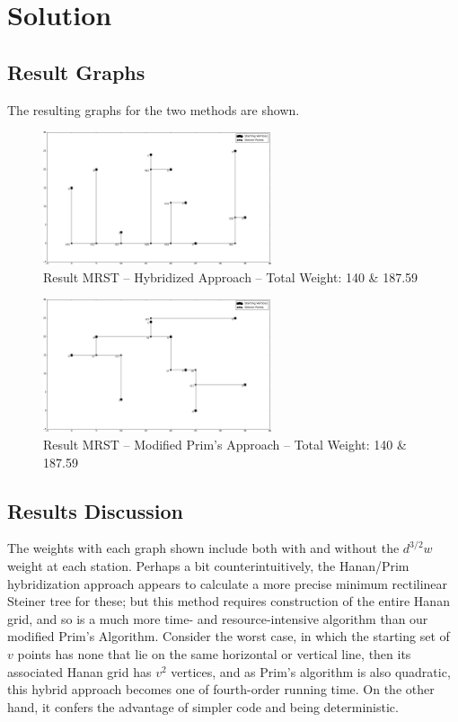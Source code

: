 \documentclass[12pt,letterpaper]{article}
\theoremstyle{definition}\newtheorem{defn}[defncounter]{Definition}
\theoremstyle{remark}\newtheorem*{remark}{Remark}
\begin{document}
\section{Solution}

\subsection{Result Graphs}
The resulting graphs for the two methods are shown.
 \begin{figure}[htbp!]
  	\centering
 	\includegraphics[width=0.6\textwidth]{NaiveResult}
  	\caption{Result MRST -- Hybridized Approach -- Total Weight: 140 \& 187.59} 
  	\label{naiveresult_image}
  	\end{figure}

 \begin{figure}[htbp!]
  	\centering
 	\includegraphics[width=0.6\textwidth]{SmarterResult}
  	\caption{Result MRST -- Modified Prim's Approach -- Total Weight: 140 \& 187.59} 
  	\label{smarterresult_image}
  	\end{figure}


\subsection{Results Discussion} 
The weights with each graph shown include both with and without the \(d^{3/2}w\) weight at each station. Perhaps a bit 
counterintuitively, the Hanan/Prim hybridization approach appears to calculate a more precise minimum rectilinear Steiner tree for 
these; but this method requires construction of the entire Hanan grid, and so is a much more time- and resource-intensive 
algorithm than our modified Prim's Algorithm. Consider the worst case, in which the starting set of \(v\) points has none that lie 
on the same horizontal or vertical line, then its associated Hanan grid has \(v^2\) vertices, and as Prim's algorithm is also 
quadratic, this hybrid approach becomes one of fourth-order running time. On the other hand, it confers the advantage of simpler 
code and being deterministic.
\end{document}
